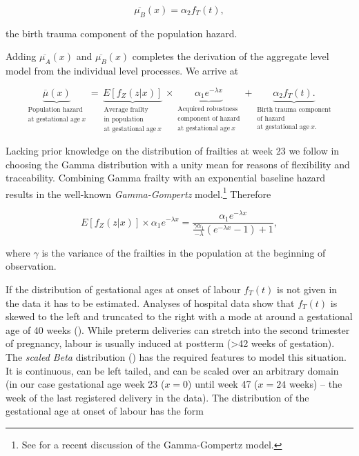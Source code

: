 \documentclass[12pt, parskip=half]{scrartcl}
\begin{document}
\begin{equation}
  \overline{\mu_B}(x) = \alpha_2 f_T(t),
\end{equation}

the birth trauma component of the population hazard.

Adding $\overline{\mu_A}(x)$ and $\overline{\mu_B}(x)$ completes the derivation of the aggregate level model from the individual level processes. We arrive at

\begin{equation}
  \underbrace{
    \overline{\mu}(x)
  }_{\substack{
    \text{Population hazard}\\ \text{at gestational age}~x
  }} =
  \underbrace{
    E[f_Z(z|x)]
  }_{\substack{
    \text{Average frailty}\\ \text{in population}\\ \text{at gestational age}~x
  }} \times
  \underbrace{
    \alpha_1 e^{-\lambda x}
  }_{\substack{
    \text{Acquired robustness}\\ \text{component of hazard}\\ \text{at gestational age}~x
  }} +
  \underbrace{
    \alpha_2 f_T(t).
  }_{\substack{
    \text{Birth trauma component}\\ \text{of hazard}\\ \text{at gestational age}~x.
  }}
  \label{eq:themodel}
\end{equation}

Lacking prior knowledge on the distribution of frailties at week 23 we follow \cite{Vaupel1979} in choosing the Gamma distribution with a unity mean for reasons of flexibility and traceability. Combining Gamma frailty with an exponential baseline hazard results in the well-known \emph{Gamma-Gompertz} model.\footnote{See \cite{Vaupel2014} for a recent discussion of the Gamma-Gompertz model.} Therefore

\begin{equation}
  E[f_Z(z|x)] \times \alpha_1 e^{-\lambda x} = \frac {\alpha_1 e^{-\lambda x}} {\frac{\gamma \alpha_1} {-\lambda} (e^{-\lambda x} - 1) + 1},
  \label{eq:gammagompertz}
\end{equation}

where $\gamma$ is the variance of the frailties in the population at the beginning of observation.

If the distribution of gestational ages at onset of labour $f_T(t)$ is not given in the data it has to be estimated. Analyses of hospital data show that $f_T(t)$ is skewed to the left and truncated to the right with a mode at around a gestational age of 40 weeks (\cite{Gardosi1997}). While preterm deliveries can stretch into the second trimester of pregnancy, labour is usually induced at postterm (>42 weeks of gestation). The \emph{scaled Beta} distribution (\cite{Johnson1995}) has the required features to model this situation. It is continuous, can be left tailed, and can be scaled over an arbitrary domain (in our case gestational age week 23 ($x = 0$) until week 47 ($x = 24$ weeks) -- the week of the last registered delivery in the data). The distribution of the gestational age at onset of labour has the form
\end{document}

